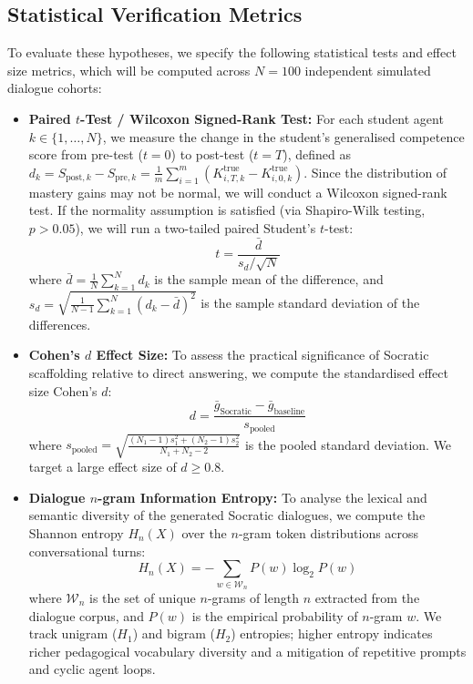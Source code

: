 \subsection{Statistical Verification Metrics}
To evaluate these hypotheses, we specify the following statistical tests and effect size metrics, which will be computed across $N = 100$ independent simulated dialogue cohorts:
\begin{itemize}
    \item \textbf{Paired $t$-Test / Wilcoxon Signed-Rank Test:} For each student agent $k \in \{1, \dots, N\}$, we measure the change in the student's generalised competence score from pre-test ($t=0$) to post-test ($t=T$), defined as $d_k = S_{\text{post}, k} - S_{\text{pre}, k} = \frac{1}{m} \sum_{i=1}^m \left( K^{\text{true}}_{i, T, k} - K^{\text{true}}_{i, 0, k} \right)$. Since the distribution of mastery gains may not be normal, we will conduct a Wilcoxon signed-rank test. If the normality assumption is satisfied (via Shapiro-Wilk testing, $p > 0.05$), we will run a two-tailed paired Student's $t$-test:
    \begin{equation}
        t = \frac{\bar{d}}{s_d / \sqrt{N}}
    \end{equation}
    where $\bar{d} = \frac{1}{N} \sum_{k=1}^N d_k$ is the sample mean of the difference, and $s_d = \sqrt{\frac{1}{N-1} \sum_{k=1}^N (d_k - \bar{d})^2}$ is the sample standard deviation of the differences.
    \item \textbf{Cohen's $d$ Effect Size:} To assess the practical significance of Socratic scaffolding relative to direct answering, we compute the standardised effect size Cohen's $d$:
    \begin{equation}
        d = \frac{\bar{g}_{\text{Socratic}} - \bar{g}_{\text{baseline}}}{s_{\text{pooled}}}
    \end{equation}
    where $s_{\text{pooled}} = \sqrt{\frac{(N_1-1)s_1^2 + (N_2-1)s_2^2}{N_1 + N_2 - 2}}$ is the pooled standard deviation. We target a large effect size of $d \ge 0.8$.
    \item \textbf{Dialogue $n$-gram Information Entropy:} To analyse the lexical and semantic diversity of the generated Socratic dialogues, we compute the Shannon entropy $H_n(X)$ over the $n$-gram token distributions across conversational turns:
    \begin{equation}
        H_n(X) = -\sum_{w \in \mathcal{W}_n} P(w) \log_2 P(w)
    \end{equation}
    where $\mathcal{W}_n$ is the set of unique $n$-grams of length $n$ extracted from the dialogue corpus, and $P(w)$ is the empirical probability of $n$-gram $w$. We track unigram ($H_1$) and bigram ($H_2$) entropies; higher entropy indicates richer pedagogical vocabulary diversity and a mitigation of repetitive prompts and cyclic agent loops.
\end{itemize}

